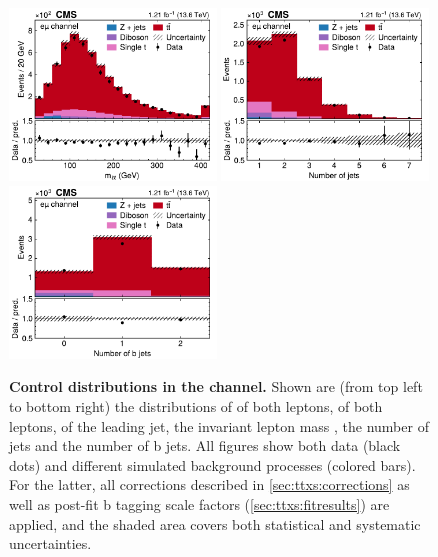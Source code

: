 \begin{figure}[!hp]
\hfill
\includegraphics[width=0.49\textwidth]{figures/ttxs/mll_em.pdf}
\includegraphics[width=0.49\textwidth]{figures/ttxs/njet_em.pdf}
\hfill
\includegraphics[width=0.49\textwidth]{figures/ttxs/nbtag_em.pdf}
\caption{
    \textbf{Control distributions in the \emu channel.} Shown are (from top left to bottom right) the distributions of \pt of both leptons, \abseta of both leptons, \pt of the leading jet, the invariant lepton mass \mll, the number of jets and the number of b jets. All figures show both data (black dots) and different simulated background processes (colored bars). For the latter, all corrections described in \cref{sec:ttxs:corrections} as well as post-fit b tagging scale factors (\cref{sec:ttxs:fitresults}) are applied, and the shaded area covers both statistical and systematic uncertainties. 
}
\label{fig:ttxs:control_em}
\end{figure}

